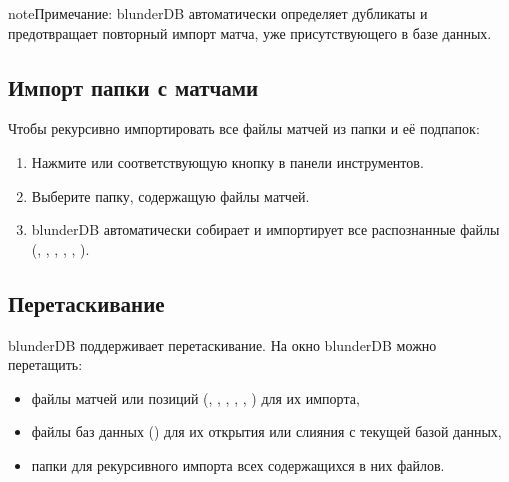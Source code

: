 \documentclass[letterpaper,10pt,russian]{sphinxmanual}
\begin{document}
\begin{sphinxadmonition}{note}{Примечание:}
\sphinxAtStartPar
blunderDB автоматически определяет дубликаты и предотвращает повторный импорт матча, уже присутствующего в базе данных.
\end{sphinxadmonition}


\subsection{Импорт папки с матчами}
\label{\detokenize{guide_utilisateur:importer-un-dossier-de-matchs}}
\sphinxAtStartPar
Чтобы рекурсивно импортировать все файлы матчей из папки и её подпапок:
\begin{enumerate}
%
\item {} 
\sphinxAtStartPar
Нажмите  или соответствующую кнопку в панели инструментов.

\item {} 
\sphinxAtStartPar
Выберите папку, содержащую файлы матчей.

\item {} 
\sphinxAtStartPar
blunderDB автоматически собирает и импортирует все распознанные файлы (, , , , , ).

\end{enumerate}


\subsection{Перетаскивание}
\label{\detokenize{guide_utilisateur:glisser-deposer}}
\sphinxAtStartPar
blunderDB поддерживает перетаскивание. На окно blunderDB можно перетащить:
\begin{itemize}
\item {} 
\sphinxAtStartPar
файлы матчей или позиций (, , , , , ) для их импорта,

\item {} 
\sphinxAtStartPar
файлы баз данных () для их открытия или слияния с текущей базой данных,

\item {} 
\sphinxAtStartPar
папки для рекурсивного импорта всех содержащихся в них файлов.

\end{itemize}
\end{document}
